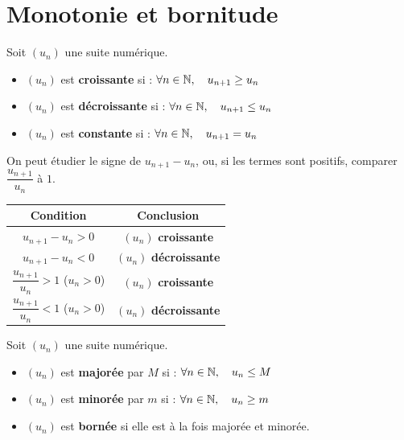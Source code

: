 \section{Monotonie et bornitude}

\begin{definition}
  Soit $(u_n)$ une suite num\'{e}rique.
  \begin{itemize}
    \item $(u_n)$ est \textbf{croissante} si :
          $\forall n \in \mathbb{N},\quad u_{n+1} \geq u_n$
    \item $(u_n)$ est \textbf{d\'{e}croissante} si :
          $\forall n \in \mathbb{N},\quad u_{n+1} \leq u_n$
    \item $(u_n)$ est \textbf{constante} si :
          $\forall n \in \mathbb{N},\quad u_{n+1} = u_n$
  \end{itemize}
\end{definition}

\begin{methode}
  On peut \'{e}tudier le signe de $u_{n+1} - u_n$, ou,
  si les termes sont positifs, comparer $\dfrac{u_{n+1}}{u_n}$ \`{a} $1$.

  \medskip
  \begin{center}
  \renewcommand{\arraystretch}{1.8}
  \begin{tabular}{|c|c|}
    \hline
    \textbf{\color{navy}Condition}
      & \textbf{\color{navy}Conclusion} \\
    \hline\hline
    $u_{n+1} - u_n > 0$
      & $(u_n)$ \textbf{croissante} \\
    \hline
    $u_{n+1} - u_n < 0$
      & $(u_n)$ \textbf{d\'{e}croissante} \\
    \hline
    $\dfrac{u_{n+1}}{u_n} > 1$ \; ($u_n > 0$)
      & $(u_n)$ \textbf{croissante} \\
    \hline
    $\dfrac{u_{n+1}}{u_n} < 1$ \; ($u_n > 0$)
      & $(u_n)$ \textbf{d\'{e}croissante} \\
    \hline
  \end{tabular}
  \end{center}
\end{methode}

\begin{definition}
  Soit $(u_n)$ une suite num\'{e}rique.
  \begin{itemize}
    \item $(u_n)$ est \textbf{major\'{e}e} par $M$ si :
          $\forall n \in \mathbb{N},\quad u_n \leq M$
    \item $(u_n)$ est \textbf{minor\'{e}e} par $m$ si :
          $\forall n \in \mathbb{N},\quad u_n \geq m$
    \item $(u_n)$ est \textbf{born\'{e}e} si elle est \`{a} la fois
          major\'{e}e et minor\'{e}e.
  \end{itemize}
\end{definition}

